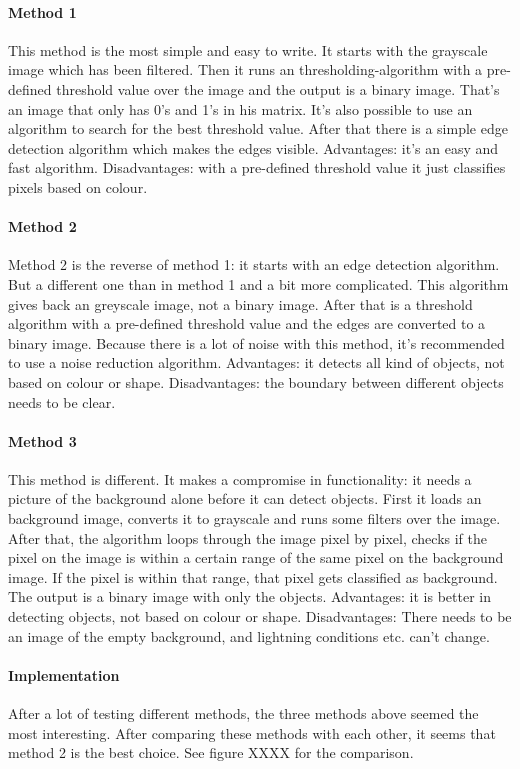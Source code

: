 \documentclass{article}
\begin{document}
\paragraph{Method 1}
This method is the most simple and easy to write. It starts with the grayscale image which has been filtered. Then it runs an thresholding-algorithm with a pre-defined threshold value over the image and the output is a binary image. That’s an image that only has 0’s and 1’s in his matrix.  It’s also possible to use an algorithm to search for the best threshold value.  After that there is a simple edge detection algorithm which makes the edges visible. 
Advantages: it’s an easy and fast algorithm.
Disadvantages: with a pre-defined threshold value it just classifies pixels based on colour. 
\paragraph{Method 2}
Method 2 is the reverse of method 1: it starts with an edge detection algorithm. But a different one than in method 1 and a bit more complicated. This algorithm gives back an greyscale image, not a binary image. After that is a threshold algorithm with a pre-defined threshold value and the edges are converted to a binary image. Because there is a lot of noise with this method, it's recommended to use a noise reduction algorithm. 
Advantages: it detects all kind of objects, not based on colour or shape.
Disadvantages: the boundary between different objects needs to be clear.
\paragraph{Method 3}
This method is different. It makes a compromise in functionality: it needs a picture of the background alone before it can detect objects. First it loads an background image, converts it to grayscale and runs some filters over the image. After that, the algorithm loops through the image pixel by pixel, checks if the pixel on the image is within a certain range of the same pixel on the background image. If the pixel is within that range, that pixel gets classified as background. The output is a binary image with only the objects.  
Advantages: it is better in detecting objects, not based on colour or shape.
Disadvantages: There needs to be an image of the empty background, and lightning conditions etc. can’t change.

\paragraph{Implementation}
After a lot of testing different methods, the three methods above seemed the most interesting. After comparing these methods with each other, it seems that method 2 is the best choice. See figure XXXX for the comparison.
\end{document}

